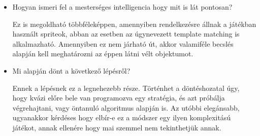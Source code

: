 
\begin{itemize}
    \item Hogyan ismeri fel a mesterséges intelligencia hogy mit is lát pontosan?
    
    Ez is megoldható többféleképpen, amennyiben rendelkezésre állnak a játékban használt spriteok, abban az esetben az úgynevezett template matching is alkalmazható. Amennyiben ez nem járható út, akkor valamiféle becslés alapján kell meghatározni az éppen látni vélt objektumot.

    \item Mi alapján dönt a következő lépésről?
    
    Ennek a lépésnek ez a legnehezebb része. Történhet a döntéshozatal úgy, hogy kvázi előre bele van programozva egy stratégia, és azt próbálja végrehajtani, vagy öntanuló algoritmus alapján is. Az utóbbi elegánsabb, ugyanakkor kérdéses hogy elbír-e ez a módszer egy ilyen komplexitású játékot, annak ellenére hogy mai szemmel nem tekinthetjük annak. 
\end{itemize}
